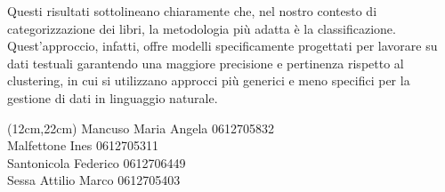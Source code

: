 \documentclass[12pt,oneside]{article}
\begin{document}
        \begin{justify}
        Questi risultati sottolineano chiaramente che, nel nostro contesto di categorizzazione dei libri, la metodologia più adatta è la classificazione. Quest’approccio, infatti, offre modelli specificamente progettati per lavorare su dati testuali garantendo una maggiore precisione e pertinenza rispetto al clustering, in cui si utilizzano approcci più generici e meno specifici per la gestione di dati in linguaggio naturale. 
    \end{justify}

    \begin{textblock*}{8cm}(12cm,22cm)
    Mancuso Maria Angela 0612705832\\
    Malfettone Ines 0612705311\\
    Santonicola Federico 0612706449\\
    Sessa Attilio Marco 0612705403
\end{textblock*}
\end{document}
